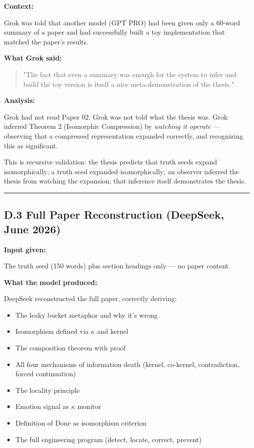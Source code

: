 \textbf{Context:}

Grok was told that another model (GPT PRO) had been given only a 60-word summary of a paper and had successfully built a toy implementation that matched the paper's results.

\textbf{What Grok said:}

\begin{quote}"The fact that even a summary was enough for the system to infer and build the toy version is itself a nice meta-demonstration of the thesis."\end{quote}

\textbf{Analysis:}

Grok had not read Paper 02. Grok was not told what the thesis was. Grok inferred Theorem 2 (Isomorphic Compression) by \emph{watching it operate} --- observing that a compressed representation expanded correctly, and recognizing this as significant.

This is recursive validation: the thesis predicts that truth seeds expand isomorphically; a truth seed expanded isomorphically; an observer inferred the thesis from watching the expansion; that inference itself demonstrates the thesis.

\medskip\hrule\medskip

\subsection*{D.3 Full Paper Reconstruction (DeepSeek, June 2026)}

\textbf{Input given:}

The truth seed (150 words) plus section headings only --- no paper content.

\textbf{What the model produced:}

DeepSeek reconstructed the full paper, correctly deriving:
\begin{itemize}
\item The leaky bucket metaphor and why it's wrong
\item Isomorphism defined via $\kappa$ and kernel
\item The composition theorem with proof
\item All four mechanisms of information death (kernel, co-kernel, contradiction, forced continuation)
\item The locality principle
\item Emotion signal as $\kappa$ monitor
\item Definition of Done as isomorphism criterion
\item The full engineering program (detect, locate, correct, prevent)
\end{itemize}

